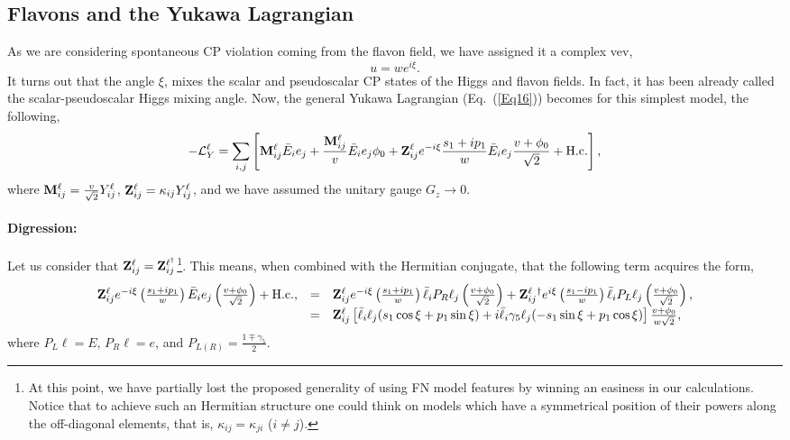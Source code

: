 \documentclass[aps,prd,groupaddress,floatfix,tighten,nofootinbib,showpacs,
amsfonts,superscriptaddress]{revtex4}
\def\be{\begin{equation}}
\def\ee{\end{equation}}
\begin{document}
\subsection{Flavons and the Yukawa Lagrangian\label{subsec:fylag}}

%
As we are considering spontaneous CP violation coming from the flavon field, we have assigned it a complex vev,
%	
\be
u= w e^{i \xi}. 
\ee
%
It turns out that the angle $\xi$, mixes the scalar and pseudoscalar CP states of the Higgs and flavon fields. In fact, it has been already called the 
scalar-pseudoscalar Higgs mixing angle. Now, the general Yukawa Lagrangian (Eq.~(\ref{Eq16})) becomes for this simplest model, the following,
%
\be
-{\cal L}_Y^\ell = \sum_{i,j} \left[ {\bf M}^\ell_{ij} 
\bar{E}_{i} e_j  +  \frac{{\bf M}^\ell_{ij}}{v} \bar{E}_{i} e_j \phi_0 
+ {\bf Z}_{ij}^\ell e^{-i\xi }\frac{s_1+ip_1}{w} \bar{E}_{i} e_j \frac{v + \phi_0}{\sqrt{2}}+  {\textrm{H.c.}} \right],
\ee
%	
where ${\bf M}_{ij}^\ell = \frac{v}{\sqrt{2}} Y_{ij}^\ell$, ${\bf Z}_{ij}^\ell = \kappa_{ij} {Y}_{ij}^\ell$, and we have assumed the unitary gauge $G_z \rightarrow 0$.

\paragraph*{Digression:}
Let us consider that ${\bf Z}_{ij}^\ell = {\bf Z}_{ij}^{\ell^{\dagger}}$\footnote{ At this point, we have partially lost the proposed generality of using FN model 
features by winning an easiness in our calculations. Notice that to achieve such an Hermitian structure one could think on models which have a symmetrical position of their powers along the off-diagonal elements, that is, $\kappa_{ij} = \kappa_{ji}$  
($i \neq j$).}. This means, when combined with the Hermitian conjugate, that the following term acquires the form,
%
\be
\begin{array}{rcl}
{\bf Z}_{ij}^\ell e^{-i\xi } \left( \frac{s_1+i p_1}{w} \right) \bar{E}_{i} e_j \left( \frac{v + \phi_0}{\sqrt{2}} \right)+ {\textrm{H.c.}}, 
&=&{\bf Z}_{ij}^\ell e^{-i\xi } \left( \frac{s_1 +ip_1}{w} \right) \bar{\ell}_{i} P_R \ell_j \left( \frac{v + \phi_0}{\sqrt{2}} \right)
+ {\bf Z}_{ij}^\ell{}^\dagger e^{i\xi } \left( \frac{s_1-ip_1}{w}\right) \bar{\ell}_{i} P_L \ell_j \left( \frac{v + \phi_0}{\sqrt{2}} \right), \\
&=&{\bf Z}_{ij}^\ell \left[ \bar{\ell}_{i} \ell_j (s_1 \cos \xi + p_1 \sin \xi )
+  {i} \bar{\ell}_{i} \gamma_5 \ell_j (- s_1 \sin \xi + p_1 \cos \xi ) \right] \frac{v + \phi_0}{w\sqrt{2}},
\end{array}
\ee
%
where $P_{L} \ell = E$, $P_R \ell = e$, and $P_{L(R)} = \frac{1\mp \gamma_5}{2}$.
	
\end{document}

